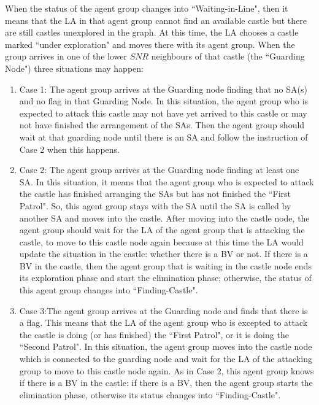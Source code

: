 When the status of the agent group changes into ``Waiting-in-Line", then it means that the  LA in that agent group cannot find an available castle but there are still castles unexplored in the graph. At this time, the LA    chooses a castle marked ``under exploration" and moves there with its agent group. When the   group arrives in one of the lower $SNR$ neighbours of that castle (the ``Guarding Node")  three situations may happen:
\begin{enumerate}
\item Case 1: The agent group arrives at the Guarding node finding that no SA(s) and no flag in that  Guarding Node. In this situation, the agent group who is expected to attack this castle may not have yet arrived to this castle or may not have  finished the arrangement of the SAs. Then the agent group should wait at that guarding node until there is an SA and   follow  the instruction of Case 2 when this happens.  

\item Case 2: The agent group arrives at the Guarding node finding at least one SA. In this situation, it means that the agent group who is expected to attack the castle has finished arranging the SAs but has not finished the ``First Patrol". So, this agent group stays with the SA until the SA is called by another SA and moves into the castle. After moving into the castle node, the agent group should wait for the LA of the agent group that is attacking the castle, to move to this castle node again because at this time the LA would update the situation in the castle: whether there is a BV or not. If there is a BV in the castle, then the agent group that is waiting in the castle node ends its exploration phase and start the elimination phase; otherwise,   the status of this agent group changes into ``Finding-Castle".

\item Case 3:The agent group arrives at the Guarding node and finds that there is a flag. This means that the LA of the agent group who is excepted to attack the castle is doing (or has finished) the ``First Patrol", or it is doing the   ``Second Patrol". In this situation, the agent group moves into the castle node which is connected to the guarding node   and wait  for the LA of the attacking  group  to move to this castle node again. As in Case 2, this agent group  knows   if there is a BV in the castle:  if there is a BV, then the agent group starts the elimination phase, otherwise its status  changes into ``Finding-Castle".
\end{enumerate}


